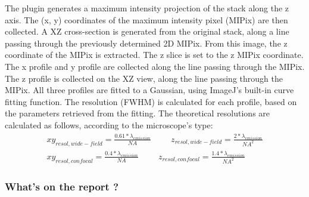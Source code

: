 \documentclass[]{spie}
\begin{document}
The plugin generates a maximum intensity projection of the stack along the z axis. The (x, y) coordinates of the maximum intensity pixel (MIPix) are then collected. A XZ cross-section is generated from the original stack, along a line passing through the previously determined 2D MIPix. From this image, the z coordinate of the MIPix is extracted. The z slice is set to the z MIPix coordinate. The x profile and y profile are collected along the line passing through the MIPix. The z profile is collected on the XZ view, along the line passing through the MIPix. All three profiles are fitted to a Gaussian, using ImageJ's built-in curve fitting function. The resolution (FWHM) is calculated for each profile, based on the parameters retrieved from the fitting. The theoretical resolutions are calculated as follows, according to the microscope's type:
\begin{eqnarray}
	xy_{resol, wide-field}=\frac{0.61*\lambda_{emission}}{NA} \hspace{1cm} z_{resol, wide-field}=\frac{2*\lambda_{emission}}{NA^2}
	\label{eqn:gpr-WF}\\
	xy_{resol, confocal}=\frac{0.4*\lambda_{emission}}{NA} \hspace{1cm} z_{resol, confocal}=\frac{1.4*\lambda_{emission}}{NA^2}
	\label{eqn:gpr-conf}
\end{eqnarray}


\subsubsection*{What's on the report ?}
\label{subsubsec:gpr-report}
\end{document}
